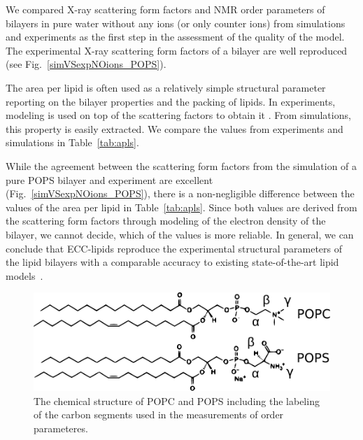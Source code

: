 \documentclass[journal=jpcbfk,manuscript=article]{achemso}
\newlength{\figwidth}
\begin{document}

We compared X-ray scattering form factors and NMR order parameters of bilayers
in pure water without any ions (or only counter ions)
from simulations and experiments
as the first step in the assessment of the quality of the model. 
The experimental X-ray scattering form factors 
of a bilayer are well reproduced  
(see Fig.~\ref{simVSexpNOions_POPS}). 

The area per lipid is often used as a relatively simple structural parameter reporting on the bilayer properties and the packing of lipids. 
In experiments, modeling is used on top of the scattering factors to obtain it \citep{kucerka14}. 
From simulations, this property is easily extracted. 
We compare the values from experiments and simulations in Table~\ref{tab:apls}. 


While the agreement between the scattering form factors 
from the simulation of a pure POPS bilayer and experiment 
are excellent (Fig.~\ref{simVSexpNOions_POPS}),
there is a non-negligible difference between the values of the area per lipid in Table~\ref{tab:apls}. 
Since both values are derived from the scattering form factors through modeling of the electron density of the bilayer,
we cannot decide, which of the values is more reliable. 
In general, we can conclude that ECC-lipids
reproduce the experimental structural parameters of the lipid bilayers 
with a comparable accuracy to existing state-of-the-art lipid models~\citep{botan15, ollila16, Pluhackova2016}. 


\begin{figure}[tb!] 
  \centering 
  \includegraphics[width=\figwidth]{../Fig/lipids_chemfig_POPC_POPS.pdf} 
  \caption{ \label{fig:chemstruct_pc_ps} 
            The chemical structure of POPC and POPS 
            including the labeling of the carbon segments
            used in the measurements of order parameteres. 
  }  
\end{figure} 
 
\end{document}
